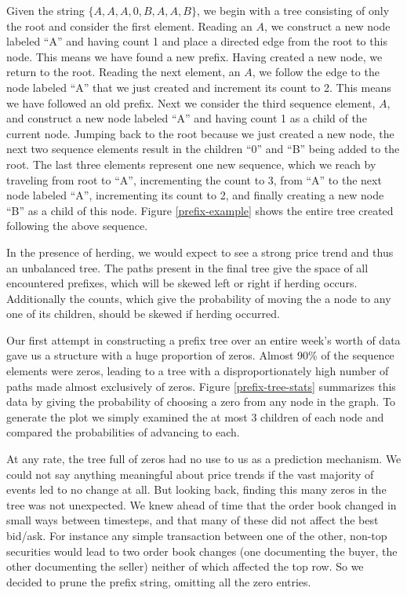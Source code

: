 Given the string $\{ A, A, A, 0, B, A, A, B\}$, we begin with a tree consisting of only the root and consider the first element.
Reading an $A$, we construct a new node labeled ``A'' and having count 1 and place a directed edge from the root to this node.
This means we have found a new prefix.
Having created a new node, we return to the root.
Reading the next element, an $A$, we follow the edge to the node labeled ``A'' that we just created and increment its count to 2. 
This means we have followed an old prefix. 
Next we consider the third sequence element, $A$, and construct a new node labeled ``A'' and having count 1 as a child of the current node.
Jumping back to the root because we just created a new node, the next two sequence elements result in the children ``0'' and ``B'' being added to the root.
The last three elements represent one new sequence, which we reach by traveling from root to ``A'', incrementing the count to 3, from ``A'' to the next node labeled ``A'', incrementing its count to 2, and finally creating a new node ``B'' as a child of this node.
Figure \ref{prefix-example} shows the entire tree created following the above sequence.



In the presence of herding, we would expect to see a strong price trend and thus an unbalanced tree.
The paths present in the final tree give the space of all encountered prefixes, which will be skewed left or right if herding occurs.
Additionally the counts, which give the probability of moving the a node to any one of its children, should be skewed if herding occurred.

Our first attempt in constructing a prefix tree over an entire week's worth of data gave us a structure with a huge proportion of zeros.
Almost 90\% of the sequence elements were zeros, leading to a tree with a disproportionately high number of paths made almost exclusively of zeros.
Figure \ref{prefix-tree-stats} summarizes this data by giving the probability of choosing a zero from any node in the graph.
To generate the plot we simply examined the at most 3 children of each node and compared the probabilities of advancing to each.

At any rate, the tree full of zeros had no use to us as a prediction mechanism. 
We could not say anything meaningful about price trends if the vast majority of events led to no change at all.
But looking back, finding this many zeros in the tree was not unexpected.
We knew ahead of time that the order book changed in small ways between timesteps, and that many of these did not affect the best bid/ask.
For instance any simple transaction between one of the other, non-top securities would lead to two order book changes (one documenting the buyer, the other documenting the seller) neither of which affected the top row.
So we decided to prune the prefix string, omitting all the zero entries.

